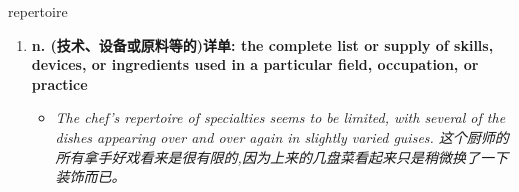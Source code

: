 
\begin{frame}
{\huge repertoire}
\begin{center}
\begin{enumerate}\Large
  \item \textbf{n. (技术、设备或原料等的)详单: the complete list or supply of skills, devices, or ingredients used in a particular field, occupation, or practice}
  \begin{itemize}
    \item \em{\Large{The chef's repertoire of specialties seems to be limited, with several of the dishes appearing over and over again in slightly varied guises. 这个厨师的所有拿手好戏看来是很有限的,因为上来的几盘菜看起来只是稍微换了一下装饰而已。}}
  \end{itemize}
\end{enumerate}
\end{center}
\end{frame}
